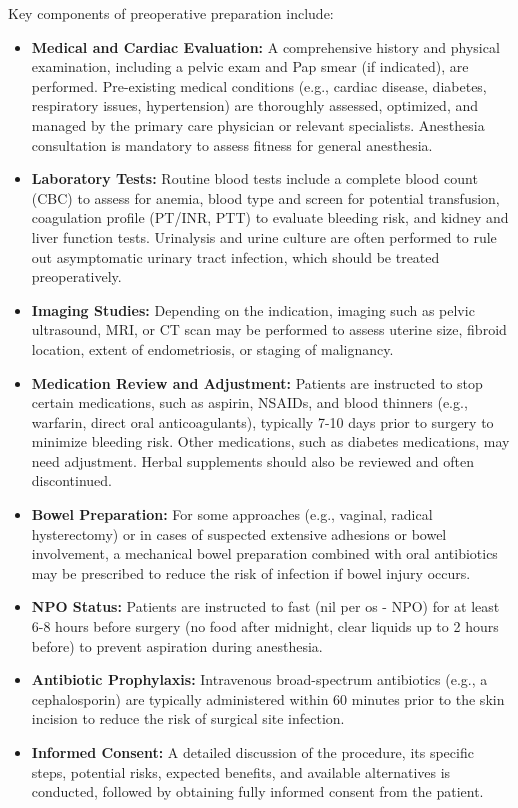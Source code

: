 Key components of preoperative preparation include:

\begin{itemize}
  \item \textbf{Medical and Cardiac Evaluation:} A comprehensive history and physical examination, including a pelvic exam and Pap smear (if indicated), are performed. Pre-existing medical conditions (e.g., cardiac disease, diabetes, respiratory issues, hypertension) are thoroughly assessed, optimized, and managed by the primary care physician or relevant specialists. Anesthesia consultation is mandatory to assess fitness for general anesthesia.

  \item \textbf{Laboratory Tests:} Routine blood tests include a complete blood count (CBC) to assess for anemia, blood type and screen for potential transfusion, coagulation profile (PT/INR, PTT) to evaluate bleeding risk, and kidney and liver function tests. Urinalysis and urine culture are often performed to rule out asymptomatic urinary tract infection, which should be treated preoperatively.

  \item \textbf{Imaging Studies:} Depending on the indication, imaging such as pelvic ultrasound, MRI, or CT scan may be performed to assess uterine size, fibroid location, extent of endometriosis, or staging of malignancy.

  \item \textbf{Medication Review and Adjustment:} Patients are instructed to stop certain medications, such as aspirin, NSAIDs, and blood thinners (e.g., warfarin, direct oral anticoagulants), typically 7-10 days prior to surgery to minimize bleeding risk. Other medications, such as diabetes medications, may need adjustment. Herbal supplements should also be reviewed and often discontinued.

  \item \textbf{Bowel Preparation:} For some approaches (e.g., vaginal, radical hysterectomy) or in cases of suspected extensive adhesions or bowel involvement, a mechanical bowel preparation combined with oral antibiotics may be prescribed to reduce the risk of infection if bowel injury occurs.

  \item \textbf{NPO Status:} Patients are instructed to fast (nil per os - NPO) for at least 6-8 hours before surgery (no food after midnight, clear liquids up to 2 hours before) to prevent aspiration during anesthesia.

  \item \textbf{Antibiotic Prophylaxis:} Intravenous broad-spectrum antibiotics (e.g., a cephalosporin) are typically administered within 60 minutes prior to the skin incision to reduce the risk of surgical site infection.

  \item \textbf{Informed Consent:} A detailed discussion of the procedure, its specific steps, potential risks, expected benefits, and available alternatives is conducted, followed by obtaining fully informed consent from the patient.
\end{itemize}

